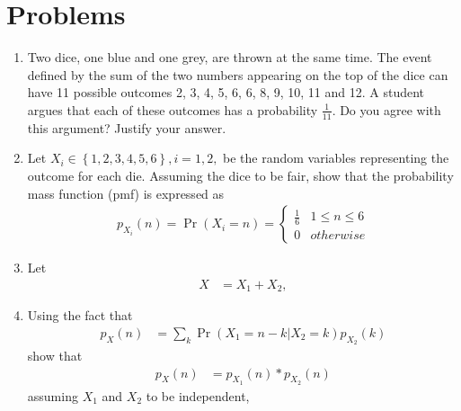 \documentclass[journal,12pt,onecolumn]{IEEEtran}
\renewcommand\thesection{\arabic{section}}
\providecommand{\pr}[1]{\ensuremath{\Pr\left(#1\right)}}
\providecommand{\cbrak}[1]{\ensuremath{\left\{#1\right\}}}
\theoremstyle{remark}
\numberwithin{equation}{section}
\begin{document}
 \section{Problems}
\begin{enumerate}[label=\arabic*.,ref=\thesection.\theenumi]
\item 
Two dice, one blue and one grey, are thrown at the same time.   The event defined by the sum of the two numbers appearing on the top of the dice can have 11 possible outcomes 2, 3, 4, 5, 6, 6, 8, 9, 10, 11 and 12.  A student argues that each of these outcomes has a probability $\frac{1}{11}$.  Do you agree with this argument?  Justify your answer.
\item Let $X_i \in \cbrak{1,2,3,4,5,6}, i = 1,2,$ be the random variables representing the outcome for each die.  Assuming the dice to be fair, show that the probability mass function (pmf) is expressed as 
\begin{align}
\label{eq:dice_pmf_xi}
p_{X_i}(n) = \pr{X_i = n} = 
\begin{cases}
\frac{1}{6} & 1 \le n \le 6
\\
0 & otherwise
\end{cases}
\end{align}
\item Let 
\begin{align}
\label{eq:dice_xdef}
X &= X_1 + X_2,
\end{align}
%
\item Using the fact that 
\begin{align}
p_X(n) 
&= \sum_{k}^{}\pr{X_1  = n -k | X_2 = k}p_{X_2}(k)
\label{eq:dice_x_sum}
\end{align}
show that 
\begin{align}
p_X(n)  
	&= p_{X_1}(n)*p_{X_2}(n)
\label{eq:dice_x_conv}
\end{align}
assuming  $X_1$ and $X_2$ to be independent,

\end{enumerate}
\end{document}
